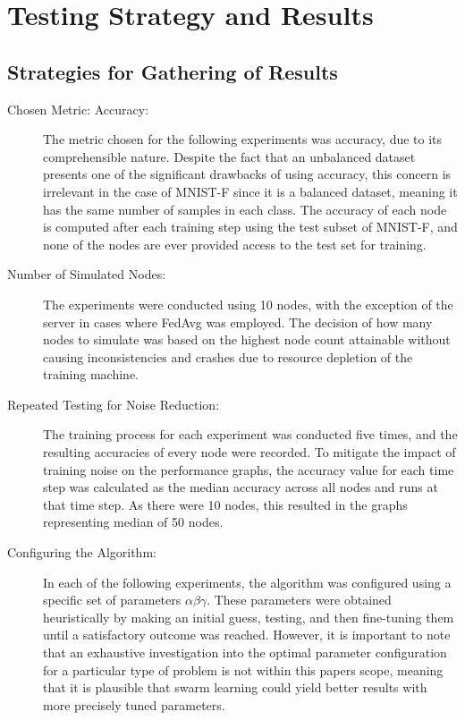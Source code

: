 \chapter{Testing Strategy and Results}
\section{Strategies for Gathering of Results}
\begin{description}
	\item [Chosen Metric: Accuracy:] The metric chosen for the following experiments was accuracy, due to its comprehensible nature. Despite the fact that an unbalanced dataset presents one of the significant drawbacks of using accuracy, this concern is irrelevant in the case of MNIST-F since it is a balanced dataset, meaning it has the same number of samples in each class. The accuracy of each node is computed after each training step using the test subset of MNIST-F, and none of the nodes are ever provided access to the test set for training.
	
	\item [Number of Simulated Nodes:] The experiments were conducted using 10 nodes, with the exception of the server in cases where FedAvg was employed. The decision of how many nodes to simulate was based on the highest node count attainable without causing inconsistencies and crashes due to resource depletion of the training machine.
	
	\item [Repeated Testing for Noise Reduction:] The training process for each experiment was conducted five times, and the resulting accuracies of every node were recorded. To mitigate the impact of training noise on the performance graphs, the accuracy value for each time step was calculated as the median accuracy across all nodes and runs at that time step. As there were 10 nodes, this resulted in the graphs representing median of 50 nodes.
	
	\item [Configuring the Algorithm:] In each of the following experiments, the algorithm was configured using a specific set of parameters $\alpha \beta \gamma$. These parameters were obtained heuristically by making an initial guess, testing, and then fine-tuning them until a satisfactory outcome was reached. However, it is important to note that an exhaustive investigation into the optimal parameter configuration for a particular type of problem is not within this papers scope, meaning that it is plausible that swarm learning could yield better results with more precisely tuned parameters.
	

\end{description}
